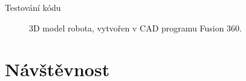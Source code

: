 \documentclass[14pt, hyperref={unicode}]{beamer}
\begin{document}
  \begin{frame}[fragile]{Testování kódu}
    \begin{figure}[H]
      \centering

      \hfill

      \caption[3D model robota]{3D model robota, vytvořen v CAD programu Fusion 360.}%
    \end{figure}
  \end{frame}

  \section{Návštěvnost}
\end{document}
